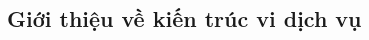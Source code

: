 \documentclass{article} %
\begin{document}
% 


% 


% 


% 

\subsection{Giới thiệu về kiến trúc vi dịch vụ}

% 







% 


% 

\end{document}
